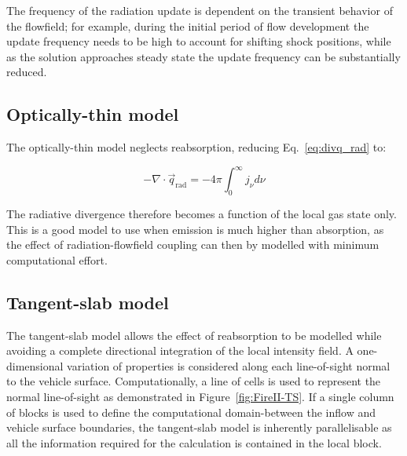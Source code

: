 The frequency of the radiation update is dependent on the transient behavior of the flowfield;  for example, during the initial period of flow development the update frequency needs to be high to account for shifting shock positions, while as the solution approaches steady state the update frequency can be substantially reduced.

\subsection{Optically-thin model}
\label{sec:optically_thin}

The optically-thin model neglects reabsorption, reducing Eq.~\ref{eq:divq_rad} to:

\begin{equation}
 - \nabla \cdot \vec{q}_\text{rad} = - 4 \pi \int^{\infty}_{0} j_{\nu} d \nu \label{eq:divq_rad_OT}
\end{equation}

\noindent The radiative divergence therefore becomes a function of the local gas state only.
This is a good model to use when emission is much higher than absorption, as the effect of radiation-flowfield coupling can then by modelled with minimum computational effort.

\subsection{Tangent-slab model}
\label{sec:TS_model}

The tangent-slab model allows the effect of reabsorption to be modelled while avoiding a complete directional integration of the local intensity field.
A one-dimensional variation of properties is considered along each line-of-sight normal to the vehicle surface.
Computationally, a line of cells is used to represent the normal line-of-sight as demonstrated in Figure~\ref{fig:FireII-TS}.
If a single column of blocks is used to define the computational domain-between the inflow and vehicle surface boundaries, the tangent-slab model is inherently parallelisable as all the information required for the calculation is contained in the local block.

\par

